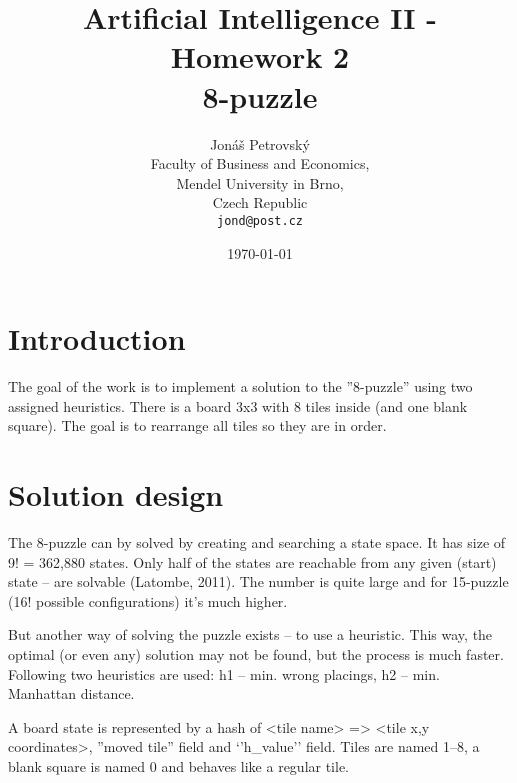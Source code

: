 \documentclass{article}
\begin{document}
\title{Artificial Intelligence II - Homework 2 \\ 8-puzzle}
\author{Jonáš Petrovský\\
        Faculty of Business and Economics,\\
		Mendel University in Brno,\\
		Czech Republic \\
		\texttt{jond@post.cz}}
\date{\today}
\maketitle

\section{Introduction}
The goal of the work is to implement a solution to the ''8-puzzle'' using two assigned heuristics. There is a board 3x3 with 8 tiles inside (and one blank square). The goal is to rearrange all tiles so they are in order. 

\section{Solution design}
The 8-puzzle can by solved by creating and searching a state space. It has size of 9! = 362,880 states. Only half of the states are reachable from any given (start) state -- are solvable (Latombe, 2011). The number is quite large and for 15-puzzle (16! possible configurations) it's much higher. 

But another way of solving the puzzle exists -- to use a heuristic. This way, the optimal (or even any) solution may not be found, but the process is much faster. Following two heuristics are used: h1 -- min. wrong placings, h2 -- min. Manhattan distance.

A board state is represented by a hash of <tile name> => <tile x,y coordinates>, ''moved tile'' field and `'h\_value'' field. Tiles are named 1--8, a blank square is named 0 and behaves like a regular tile. 
\end{document}
